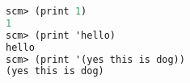 \begin{lstlisting}[language=Scheme]
scm> (print 1)
1
scm> (print 'hello)
hello
scm> (print '(yes this is dog))
(yes this is dog)
\end{lstlisting}
